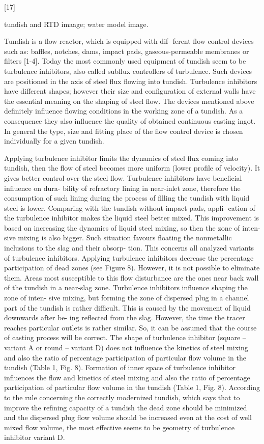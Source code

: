 [17]

tundish and RTD imaage; water model image.

Tundish is a flow reactor, which is equipped with dif-
ferent flow control devices such as: baffles, notches, dams,
impact pads, gaseous-permeable membranes or filters [1-4].
Today the most commonly used equipment of tundish seem
to be turbulence inhibitors, also called subflux controllers of
turbulence. Such devices are positioned in the axis of steel
flux flowing into tundish. Turbulence inhibitors have different
shapes; however their size and configuration of external walls
have the essential meaning on the shaping of steel flow.
The devices mentioned above definitely influence flowing
conditions in the working zone of a tundish. As a consequence
they also influence the quality of obtained continuous casting
ingot. In general the type, size and fitting place of the flow
control device is chosen individually for a given tundish.

Applying turbulence inhibitor limits the dynamics of steel
flux coming into tundish, then the flow of steel becomes
more uniform (lower profile of velocity). It gives better
control over the steel flow.
Turbulence inhibitors have beneficial influence on dura-
bility of refractory lining in near-inlet zone, therefore the
consumption of such lining during the process of filling
the tundish with liquid steel is lower.
Comparing with the tundish without impact pads, appli-
cation of the turbulence inhibitor makes the liquid steel
better mixed. This improvement is based on increasing the
dynamics of liquid steel mixing, so then the zone of inten-
sive mixing is also bigger. Such situation favours floating
the nonmetallic inclusions to the slag and their absorp-
tion. This concerns all analyzed variants of turbulence
inhibitors.
Applying turbulence inhibitors decrease the percentage
participation of dead zones (see Figure 8). However, it is not possible to eliminate them. Areas most susceptible
to this flow disturbance are the ones near back wall of the
tundish in a near-slag zone.
Turbulence inhibitors influence shaping the zone of inten-
sive mixing, but forming the zone of dispersed plug in
a channel part of the tundish is rather difficult. This is
caused by the movement of liquid downwards after be-
ing reflected from the slag. However, the time the tracer
reaches particular outlets is rather similar. So, it can be
assumed that the course of casting process will be correct.
The shape of turbulence inhibitor (square – variant A or
round – variant D) does not influence the kinetics of steel
mixing and also the ratio of percentage participation of
particular flow volume in the tundish (Table 1, Fig. 8).
Formation of inner space of turbulence inhibitor influences
the flow and kinetics of steel mixing and also the ratio of
percentage participation of particular flow volume in the
tundish (Table 1, Fig. 8).
According to the rule concerning the correctly modernized
tundish, which says that to improve the refining capacity
of a tundish the dead zone should be minimized and the
dispersed plug flow volume should be increased even at
the cost of well mixed flow volume, the most effective
seems to be geometry of turbulence inhibitor variant D.

